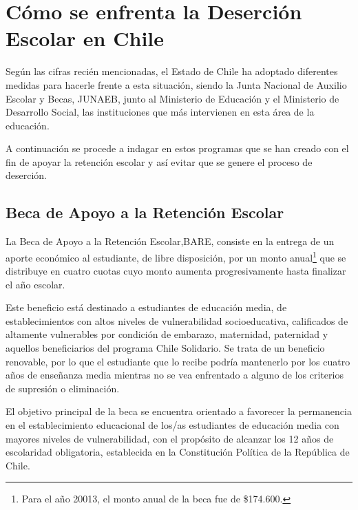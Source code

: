 \section{Cómo se enfrenta la Deserción Escolar en Chile}
Según las cifras recién mencionadas, el Estado de Chile ha adoptado diferentes medidas para hacerle frente a esta situación, siendo la Junta Nacional de Auxilio Escolar y Becas, JUNAEB, junto al Ministerio de Educación y el Ministerio de Desarrollo Social, las instituciones que más intervienen en esta área de la educación. 

A continuación se procede a indagar en estos programas que se han creado con el fin de apoyar la retención escolar y así evitar que se genere el proceso de deserción. 

\subsection{Beca de Apoyo a la Retención Escolar}
La Beca de Apoyo a la Retención Escolar,BARE, consiste en la entrega de un aporte económico al estudiante, de libre disposición, por un monto anual\footnote{Para el año 20013, el monto anual de la beca fue de \$174.600.} que se distribuye en cuatro cuotas cuyo monto aumenta progresivamente hasta finalizar el año escolar.

Este beneficio está destinado a estudiantes de educación media, de establecimientos con altos niveles de vulnerabilidad socioeducativa, calificados de altamente vulnerables por condición de embarazo, maternidad, paternidad y aquellos beneficiarios del programa Chile Solidario. Se trata de un beneficio renovable, por lo que el estudiante que lo recibe podría mantenerlo por los cuatro años de enseñanza media mientras no se vea enfrentado a alguno de los criterios de supresión o eliminación.

El objetivo principal de la beca se encuentra orientado a favorecer la permanencia en el establecimiento educacional de los/as estudiantes de educación media con mayores niveles de vulnerabilidad, con el propósito de alcanzar los 12 años de escolaridad obligatoria, establecida en la Constitución Política de la República de Chile.

